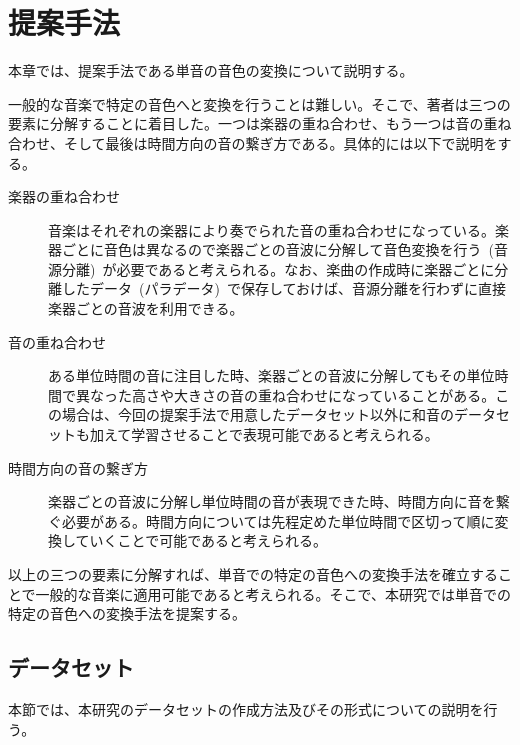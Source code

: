 \chapter{提案手法}

本章では、提案手法である単音の音色の変換について説明する。

一般的な音楽で特定の音色へと変換を行うことは難しい。そこで、著者は三つの要素に分解することに着目した。一つは楽器の重ね合わせ、もう一つは音の重ね合わせ、そして最後は時間方向の音の繋ぎ方である。具体的には以下で説明をする。

\begin{description}

\item[楽器の重ね合わせ]\mbox{}

音楽はそれぞれの楽器により奏でられた音の重ね合わせになっている。楽器ごとに音色は異なるので楽器ごとの音波に分解して音色変換を行う~(音源分離)~が必要であると考えられる。なお、楽曲の作成時に楽器ごとに分離したデータ~(パラデータ)~で保存しておけば、音源分離を行わずに直接楽器ごとの音波を利用できる。

\item[音の重ね合わせ]\mbox{}

ある単位時間の音に注目した時、楽器ごとの音波に分解してもその単位時間で異なった高さや大きさの音の重ね合わせになっていることがある。この場合は、今回の提案手法で用意したデータセット以外に和音のデータセットも加えて学習させることで表現可能であると考えられる。

\item[時間方向の音の繋ぎ方]\mbox{}


楽器ごとの音波に分解し単位時間の音が表現できた時、時間方向に音を繋ぐ必要がある。時間方向については先程定めた単位時間で区切って順に変換していくことで可能であると考えられる。

\end{description}

以上の三つの要素に分解すれば、単音での特定の音色への変換手法を確立することで一般的な音楽に適用可能であると考えられる。そこで、本研究では単音での特定の音色への変換手法を提案する。

\section{データセット}

本節では、本研究のデータセットの作成方法及びその形式についての説明を行う。


